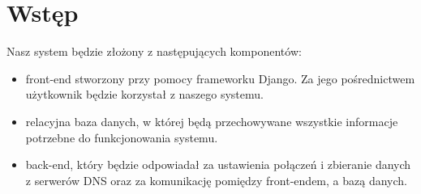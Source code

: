 \section{Wstęp}

\hspace{0.5cm} Nasz system będzie złożony z następujących komponentów:
\begin{itemize}
    \item front-end stworzony przy pomocy frameworku Django. Za jego pośrednictwem użytkownik będzie korzystał z naszego systemu.
    \item relacyjna baza danych, w której będą przechowywane wszystkie informacje potrzebne do funkcjonowania systemu.
    \item back-end, który będzie odpowiadał za ustawienia połączeń i zbieranie danych z serwerów DNS oraz za komunikację pomiędzy front-endem, a bazą danych.
\end{itemize}
